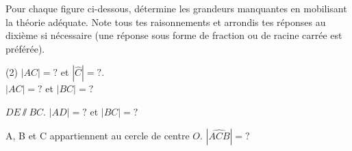 \documentclass[../partie2.tex]{subfiles}
\begin{document}
\begin{exercise}[points=8]
    Pour chaque figure ci-dessous, détermine les grandeurs manquantes en mobilisant la théorie adéquate. Note tous tes raisonnements et arrondis tes réponses au dixième si nécessaire (une réponse sous forme de fraction ou de racine carrée est préférée).

    \begin{tasks}[after-item-skip=2cm](2)
        \task
        $|AC| = ?$ et $|\widehat{C}|=?$.\\

        \task
        $|AC|=?$ et $|BC|=?$
        \begin{center}
            
        \end{center}

        \task
        $DE \sslash BC$. $|AD|=?$ et $|BC|=?$
        \begin{center}
            
        \end{center}

        \task
        A, B et C appartiennent au cercle de centre $O$. $|\widehat{ACB}|=?$
        \begin{center}
            
        \end{center}
    \end{tasks}
\end{exercise}
\end{document}
